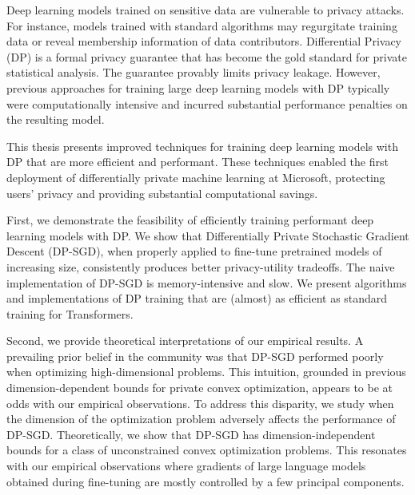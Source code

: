 
Deep learning models trained on sensitive data are vulnerable to privacy attacks.
For instance, models trained with standard algorithms may regurgitate training data or reveal membership information of data contributors.
Differential Privacy (DP) is a formal privacy guarantee that has become the gold standard for private statistical analysis.
The guarantee provably limits privacy leakage.
However, previous approaches for training large deep learning models with DP typically were computationally intensive and incurred substantial performance penalties on the resulting model.

This thesis presents improved techniques for training deep learning models with DP that are more efficient and performant.
These techniques enabled the first deployment of differentially private machine learning at Microsoft, protecting users' privacy and providing substantial computational savings.

First, we demonstrate the feasibility of efficiently training performant deep learning models with DP. 
We show that Differentially Private Stochastic Gradient Descent (DP-SGD), when properly applied to fine-tune pretrained models of increasing size, consistently produces better privacy-utility tradeoffs. The naive implementation of DP-SGD is memory-intensive and slow. We present algorithms and implementations of DP training that are (almost) as efficient as standard training for Transformers.

Second, we provide theoretical interpretations of our empirical results.
A prevailing prior belief in the community was that DP-SGD performed poorly when optimizing high-dimensional problems. This intuition, grounded in previous dimension-dependent bounds for private convex optimization, appears to be at odds with our empirical observations. To address this disparity, we study when the dimension of the optimization problem adversely affects the performance of DP-SGD. Theoretically, we show that DP-SGD has dimension-independent bounds for a class of unconstrained convex optimization problems. 
This resonates with our empirical observations where gradients of large language models obtained during fine-tuning are mostly controlled by a few principal components.

